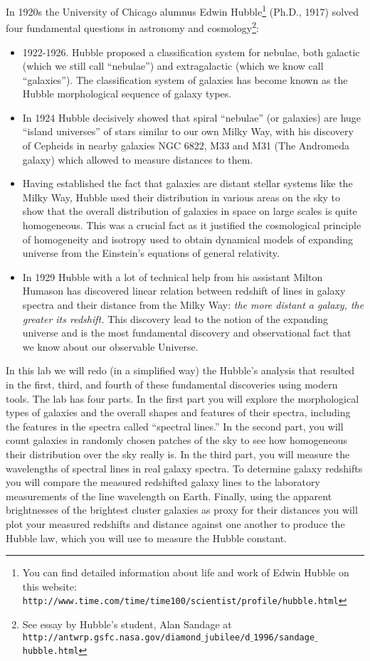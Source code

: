 \documentclass[12pt]{article}
\begin{document}
In 1920s the University of Chicago alumnus Edwin Hubble\footnote{You can find detailed information
about life and work of Edwin Hubble on this website: {\tt http://www.time.com/time/time100/scientist/profile/hubble.html}} (Ph.D., 1917) solved four fundamental questions in astronomy and cosmology\footnote{See essay by Hubble's student, Alan Sandage at\\ {\tt http://antwrp.gsfc.nasa.gov/diamond$\_$jubilee/d$\_$1996/sandage$\_$hubble.html}}:
\begin{itemize}
\item 1922-1926. Hubble proposed a classification system for nebulae,
both galactic (which we still call ``nebulae'') and extragalactic
(which we know call ``galaxies''). The classification system of
galaxies has become known as the Hubble morphological sequence of galaxy types.
\item In 1924 Hubble decisively showed that spiral ``nebulae'' (or galaxies) are 
huge ``island universes'' of stars similar to our own Milky Way, 
with his discovery of Cepheids in nearby galaxies NGC 6822, M33 and M31 
(The Andromeda galaxy) which allowed to measure distances to them.

\item Having established the fact that galaxies are distant stellar systems
like the Milky Way, Hubble used their distribution in various areas on the sky
to show that the overall distribution of galaxies in space on large scales is
quite homogeneous. This was a crucial fact as it justified the cosmological 
principle of homogeneity and isotropy used to obtain dynamical models of 
expanding universe from the Einstein's equations of general relativity. 

\item In 1929 Hubble with a lot of technical help from his assistant Milton Humason has discovered 
linear relation between redshift of lines in galaxy spectra and their distance from the Milky Way: 
{\it the more distant a galaxy, the greater its
redshift.}
 This discovery lead to the notion of
the expanding universe and is the most fundamental discovery and observational fact that we know
about our observable Universe.
\end{itemize}
In this lab we will redo (in a simplified way) the Hubble's analysis
that resulted in the first, third, and fourth of these fundamental
discoveries using modern tools. The lab has four parts. In the first
part you will explore the morphological types of galaxies and the
overall shapes and features of their spectra, including the features
in the spectra called ``spectral lines.''  In the second part, you will
count galaxies in randomly chosen patches of the sky to see how homogeneous
their distribution over the sky really is. In the third part, you
will measure the wavelengths of spectral lines in real galaxy
spectra. To determine galaxy redshifts you will compare the measured
redshifted galaxy lines to the laboratory measurements of the line
wavelength on Earth.  Finally, using the apparent brightnesses of the
brightest cluster galaxies as proxy for their distances you will plot
your measured redshifts and distance against one another to produce
the Hubble law, which you will use to measure the Hubble constant.
\end{document}
